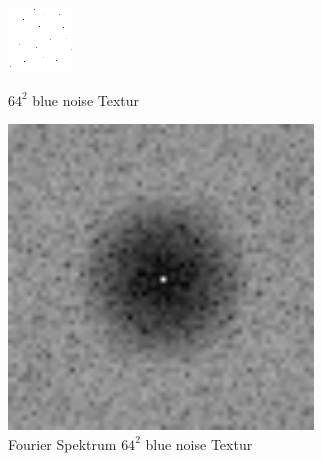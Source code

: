 \begin{figure}[H]\label{pic:blueNoiseFFT}
    \centering
    \begin{minipage}[t]{0.45\linewidth}
        \centering
        \includegraphics[width=.75\linewidth]{content/BlueNoise/Bilder/HDR_L_0.png}
        \caption{$64^{2}$ blue noise Textur}
    \end{minipage}
    \hfill
    \begin{minipage}[t]{0.45\linewidth}
        \centering
        \includegraphics[width=\linewidth]{content/BlueNoise/Bilder/FFT_HDR_L_0.png}
        \caption{Fourier Spektrum $64^{2}$ blue noise Textur}
    \end{minipage}
\end{figure}

